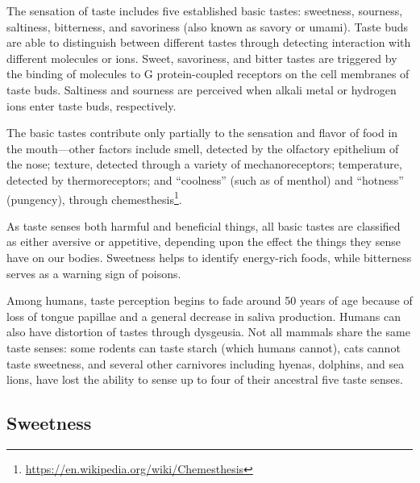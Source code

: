 \documentclass[]{book}
\let\rmarkdownfootnote\footnote%
\def\footnote{\protect\rmarkdownfootnote}
\renewcommand{\href}[2]{#2\footnote{\url{#1}}}
\begin{document}
The sensation of taste includes five established basic tastes: sweetness, sourness, saltiness, bitterness, and savoriness (also known as savory or umami). Taste buds are able to distinguish between different tastes through detecting interaction with different molecules or ions. Sweet, savoriness, and bitter tastes are triggered by the binding of molecules to G protein-coupled receptors on the cell membranes of taste buds. Saltiness and sourness are perceived when alkali metal or hydrogen ions enter taste buds, respectively.

The basic tastes contribute only partially to the sensation and flavor of food in the mouth---other factors include smell, detected by the olfactory epithelium of the nose; texture, detected through a variety of mechanoreceptors; temperature, detected by thermoreceptors; and ``coolness'' (such as of menthol) and ``hotness'' (pungency), through \href{https://en.wikipedia.org/wiki/Chemesthesis}{chemesthesis}.

As taste senses both harmful and beneficial things, all basic tastes are classified as either aversive or appetitive, depending upon the effect the things they sense have on our bodies. Sweetness helps to identify energy-rich foods, while bitterness serves as a warning sign of poisons.

Among humans, taste perception begins to fade around 50 years of age because of loss of tongue papillae and a general decrease in saliva production. Humans can also have distortion of tastes through dysgeusia. Not all mammals share the same taste senses: some rodents can taste starch (which humans cannot), cats cannot taste sweetness, and several other carnivores including hyenas, dolphins, and sea lions, have lost the ability to sense up to four of their ancestral five taste senses.

\hypertarget{sweetness}{%
\subsection{Sweetness}\label{sweetness}}
\end{document}
